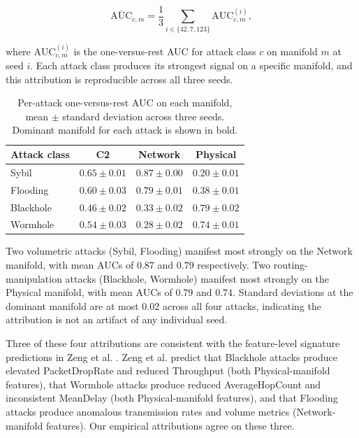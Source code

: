 \documentclass[conf]{new-aiaa}
\begin{document}
\begin{equation}
\overline{\text{AUC}}_{c, m} = \frac{1}{3} \sum_{i \in \{42, 7, 123\}} \text{AUC}_{c, m}^{(i)},
\label{eq:auc_mean}
\end{equation}

where $\text{AUC}_{c, m}^{(i)}$ is the one-versus-rest AUC for attack class $c$ on manifold $m$ at seed $i$. Each attack class produces its strongest signal on a specific manifold, and this attribution is reproducible across all three seeds.

\begin{table}[h]
\centering
\caption{Per-attack one-versus-rest AUC on each manifold, mean $\pm$ standard deviation across three seeds. Dominant manifold for each attack is shown in bold.}
\label{tab:per_attack_auc}
\begin{tabular}{lccc}
\hline
Attack class & C2 & Network & Physical \\
\hline
Sybil & $0.65 \pm 0.01$ & $\mathbf{0.87 \pm 0.00}$ & $0.20 \pm 0.01$ \\
Flooding & $0.60 \pm 0.03$ & $\mathbf{0.79 \pm 0.01}$ & $0.38 \pm 0.01$ \\
Blackhole & $0.46 \pm 0.02$ & $0.33 \pm 0.02$ & $\mathbf{0.79 \pm 0.02}$ \\
Wormhole & $0.54 \pm 0.03$ & $0.28 \pm 0.02$ & $\mathbf{0.74 \pm 0.01}$ \\
\hline
\end{tabular}
\end{table}

Two volumetric attacks (Sybil, Flooding) manifest most strongly on the Network manifold, with mean AUCs of $0.87$ and $0.79$ respectively. Two routing-manipulation attacks (Blackhole, Wormhole) manifest most strongly on the Physical manifold, with mean AUCs of $0.79$ and $0.74$. Standard deviations at the dominant manifold are at most $0.02$ across all four attacks, indicating the attribution is not an artifact of any individual seed.

Three of these four attributions are consistent with the feature-level signature predictions in Zeng et al. \cite{Zeng}. Zeng et al. predict that Blackhole attacks produce elevated PacketDropRate and reduced Throughput (both Physical-manifold features), that Wormhole attacks produce reduced AverageHopCount and inconsistent MeanDelay (both Physical-manifold features), and that Flooding attacks produce anomalous transmission rates and volume metrics (Network-manifold features). Our empirical attributions agree on these three.
\end{document}
